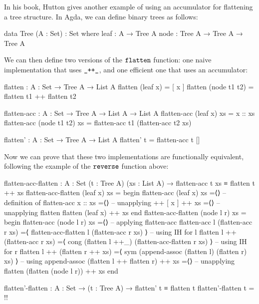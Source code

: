 \documentclass[a4paper,UKenglish]{tufte-handout}
\theoremstyle{definition}
\newcommand\fun[1]{{\AgdaFunction{#1}}}
\begin{document}
In his book, Hutton gives another example of using
an accumulator for flattening a tree structure. In Agda, we can define
binary trees as follows:
\begin{code}[number]
data Tree (A : Set) : Set where
  leaf  : A → Tree A
  node  : Tree A → Tree A → Tree A
\end{code}
We can then define two versions of the $\fun{flatten}$ function: one
naive implementation that uses $\fun{\_++\_}$, and one efficient one
that uses an accumulator:
\begin{AgdaAlign}
\begin{AgdaSuppressSpace}
\begin{code}[number]
flatten : {A : Set} → Tree A → List A
flatten (leaf x)      = [ x ]
flatten (node t1 t2)  = flatten t1 ++ flatten t2

\end{code}
\begin{code}[number]
flatten-acc : {A : Set} → Tree A → List A → List A
flatten-acc (leaf x)      xs  = x :: xs
flatten-acc (node t1 t2)  xs  =
  flatten-acc t1 (flatten-acc t2 xs)

\end{code}
\begin{code}[number]
flatten' : {A : Set} → Tree A → List A
flatten' t = flatten-acc t []
\end{code}
\end{AgdaSuppressSpace}
\end{AgdaAlign}
Now we can prove that these two implementations are functionally equivalent,
following the example of the $\fun{reverse}$ function above:
\begin{fullwidth}\begin{AgdaAlign}
\begin{code}[number]
flatten-acc-flatten : {A : Set} (t : Tree A) (xs : List A) → flatten-acc t xs ≡ flatten t ++ xs
flatten-acc-flatten (leaf x)   xs =
  begin
    flatten-acc (leaf x) xs
  =⟨⟩                                                   -- definition of flatten-acc
    x :: xs
  =⟨⟩                                                   -- unapplying ++
    [ x ] ++ xs
  =⟨⟩                                                   -- unapplying flatten
    flatten (leaf x) ++ xs
  end
flatten-acc-flatten (node l r) xs =
  begin
    flatten-acc (node l r) xs
  =⟨⟩                                                   -- applying flatten-acc
    flatten-acc l (flatten-acc r xs)
  =⟨ flatten-acc-flatten l (flatten-acc r xs) ⟩         -- using IH for l
    flatten l ++ (flatten-acc r xs)
  =⟨ cong (flatten l ++_) (flatten-acc-flatten r xs) ⟩  -- using IH for r
    flatten l ++ (flatten r ++ xs)
  =⟨ sym (append-assoc (flatten l) (flatten r) xs) ⟩    -- using append-assoc
    (flatten l ++ flatten r) ++ xs
  =⟨⟩                                                   -- unapplying flatten
    (flatten (node l r)) ++ xs
  end

flatten'-flatten : {A : Set} → (t : Tree A) → flatten' t ≡ flatten t
flatten'-flatten t = {!!}
\end{code}
\end{AgdaAlign}\end{fullwidth}
\end{document}
